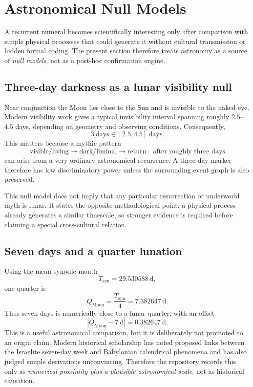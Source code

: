 \section{Astronomical Null Models}\label{sec:astro-null}

A recurrent numeral becomes scientifically interesting only after comparison
with simple physical processes that could generate it without cultural
transmission or hidden formal coding.  The present section therefore treats
astronomy as a source of \emph{null models}, not as a post-hoc confirmation
engine.

\subsection{Three-day darkness as a lunar visibility null}

Near conjunction the Moon lies close to the Sun and is invisible to the naked
eye.  Modern visibility work gives a typical invisibility interval spanning
roughly $2.5$--$4.5$ days, depending on geometry and observing conditions.
Consequently,
\[
3\ \mathrm{days}\in[2.5,4.5]\ \mathrm{days}.
\]
This matters because a mythic pattern
\[
\mathrm{visible/living}\to\mathrm{dark/liminal}\to
\mathrm{return}\quad\text{after roughly three days}
\]
can arise from a very ordinary astronomical recurrence.  A three-day marker
therefore has low discriminatory power unless the surrounding event graph is
also preserved.

This null model does not imply that any particular resurrection or underworld
myth is lunar.  It states the opposite methodological point: a physical process
already generates a similar timescale, so stronger evidence is required before
claiming a special cross-cultural relation.

\subsection{Seven days and a quarter lunation}

Using the mean synodic month
\[
T_{\mathrm{syn}}=29.530588\ \mathrm{d},
\]
one quarter is
\[
Q_{\mathrm{Moon}}=\frac{T_{\mathrm{syn}}}{4}
=7.382647\ \mathrm{d}.
\]
Thus seven days is numerically close to a lunar quarter, with an offset
\[
|Q_{\mathrm{Moon}}-7\ \mathrm{d}|=0.382647\ \mathrm{d}.
\]
This is a useful astronomical comparison, but it is deliberately not promoted
to an origin claim.  Modern historical scholarship has noted proposed links
between the Israelite seven-day week and Babylonian calendrical phenomena and
has also judged simple derivations unconvincing.  Therefore the repository
records this only as \emph{numerical proximity plus a plausible astronomical
scale}, not as historical causation.

